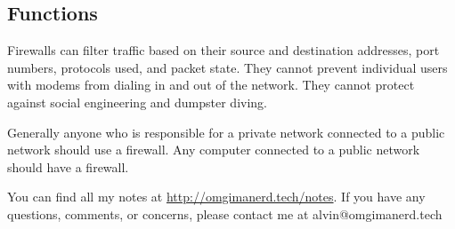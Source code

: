 \documentclass{math}
\begin{document}
\subsection*{Functions}
Firewalls can filter traffic based on their source and destination addresses,
port numbers, protocols used, and packet state. They cannot prevent individual
users with modems from dialing in and out of the network. They cannot protect
against social engineering and dumpster diving. \par
Generally anyone who is responsible for a private network connected to a public
network should use a firewall. Any computer connected to a public network should
have a firewall.

\begin{center}
  You can find all my notes at \url{http://omgimanerd.tech/notes}. If you have
  any questions, comments, or concerns, please contact me at
  alvin@omgimanerd.tech
\end{center}
\end{document}
